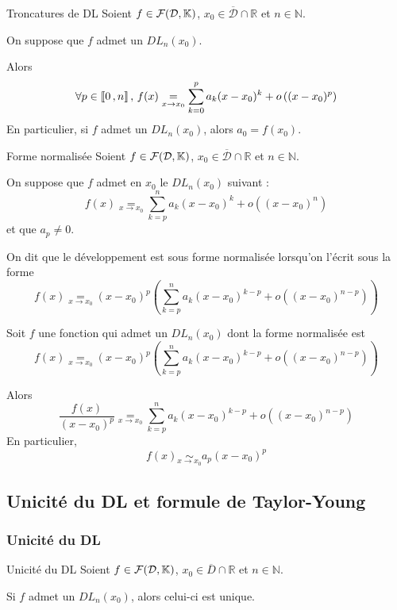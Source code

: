     \begin{prop}{Troncatures de DL}{}
        Soient $f \in \mathcal{F}(\mathcal{D},\mathbb{K})$, $x_0 \in \overline{\mathcal{D}} \cap \mathbb{R}$ et $n \in \mathbb{N}$. 

        On suppose que $f$ admet un $DL_n(x_0)$.
    
        Alors 
        \[ \forall p \in \left\llbracket 0 \, , n \right\rrbracket, \, f(x) \underset{x \rightarrow x_0}{=} \sum\limits_{k=0}^p a_k (x - x_0)^k + o\left((x-x_0)^p\right) \]
        En particulier, si $f$ admet un $DL_n(x_0)$, alors $a_0 = f(x_0)$.
    \end{prop}

    \begin{defi}{Forme normalisée}{}
        Soient $f \in \mathcal{F}(\mathcal{D},\mathbb{K})$, $x_0 \in \overline{\mathcal{D}} \cap \mathbb{R}$ et $n \in \mathbb{N}$. 

        On suppose que $f$ admet en $x_0$ le $DL_n(x_0)$ suivant : 
        \[ f(x) \underset{x \rightarrow x_0}{=} \sum\limits_{k=p}^n a_k(x-x_0)^k + o\left((x-x_0)^n\right) \] et que $a_p \neq 0$.

        On dit que le développement est sous forme normalisée lorsqu’on l’écrit sous la forme 
        \[ f(x) \underset{x \rightarrow x_0}{=} (x-x_0)^p\left(\sum\limits_{k=p}^n a_k(x-x_0)^{k-p} + o\left((x-x_0)^{n-p}\right) \right) \]
    \end{defi}

    \begin{prop}{}{}
        Soit $f$ une fonction qui admet un $DL_n(x_0)$ dont la forme normalisée est 
        \[ f(x) \underset{x \rightarrow x_0}{=} (x-x_0)^p\left(\sum\limits_{k=p}^n a_k(x-x_0)^{k-p} + o\left((x-x_0)^{n-p}\right) \right) \]

        Alors 
        \[ \frac{f(x)}{(x-x_0)^p} \underset{x \rightarrow x_0}{=} \sum\limits_{k=p}^n a_k(x-x_0)^{k-p} + o\left((x-x_0)^{n-p}\right) \]
        En particulier, 
        \[ f(x) \underset{x \rightarrow x_0}{\sim}a_p(x-x_0)^p \]
    \end{prop}

\subsection{Unicité du DL et formule de Taylor-Young}

    \subsubsection{Unicité du DL}

    \begin{theo}{Unicité du DL}{}
        Soient $f \in \mathcal{F}(\mathcal{D},\mathbb{K})$, $x_0 \in \overline{D} \cap \mathbb{R}$ et $n \in \mathbb{N}$.

        Si $f$ admet un $DL_n(x_0)$, alors celui-ci est unique.
    \end{theo}

